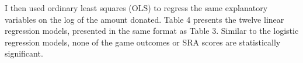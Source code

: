 \documentclass[12pt]{article}
\begin{document}
I then used ordinary least squares (OLS) to regress the same explanatory variables on the log of the amount donated. Table 4 presents the twelve linear regression models, presented in the same format as Table 3. Similar to the logistic regression models, none of the game outcomes or SRA scores are statistically significant.

\end{document}
